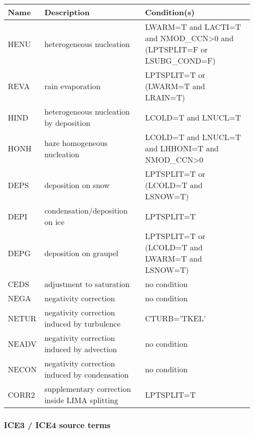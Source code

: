 \begin{longtable} {|p{}|p{}|p{}|}
\hline
Name & Description & Condition(s) \\
\hline \hline
\endhead
HENU   & heterogeneous nucleation                       & LWARM=T and LACTI=T and NMOD\_CCN>0 and (LPTSPLIT=F or LSUBG\_COND=F) \\\hline
REVA   & rain evaporation                               & LPTSPLIT=T or (LWARM=T and LRAIN=T) \\\hline
HIND   & heterogeneous nucleation by deposition         & LCOLD=T and LNUCL=T \\\hline
HONH   & haze homogeneous nucleation                    & LCOLD=T and LNUCL=T and LHHONI=T and NMOD\_CCN>0 \\\hline
DEPS   & deposition on snow                             & LPTSPLIT=T or (LCOLD=T and LSNOW=T) \\\hline
DEPI   & condensation/deposition on ice                 & LPTSPLIT=T \\\hline
DEPG   & deposition on graupel                          & LPTSPLIT=T or (LCOLD=T and LWARM=T and LSNOW=T) \\\hline
CEDS   & adjustment to saturation                       & no condition \\\hline
NEGA   & negativity correction                          & no condition \\\hline
NETUR  & negativity correction induced by turbulence    & CTURB='TKEL' \\\hline
NEADV  & negativity correction induced by advection     & no condition \\\hline
NECON  & negativity correction induced by condensation  & no condition \\\hline
CORR2  & supplementary correction inside LIMA splitting & LPTSPLIT=T \\\hline
\end{longtable}

\subsubsection{ICE3 / ICE4 source terms}

